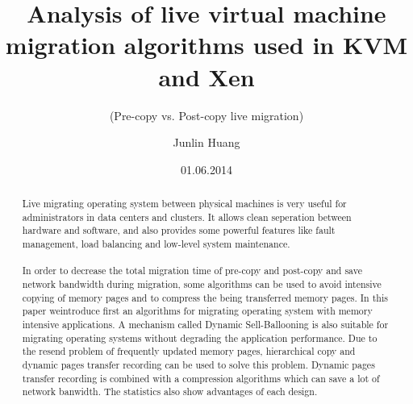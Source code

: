 \documentclass[runningheads]{llncs}
\begin{document}
\mainmatter
\title{Analysis of live virtual machine migration algorithms used in KVM and Xen}
\subtitle{(Pre-copy vs. Post-copy live migration)}
\titlerunning{}
\author{Junlin Huang}
\date{01.06.2014}
\maketitle

\begin{abstract}
Live migrating operating system between physical machines is very useful for administrators in data centers and clusters. It allows clean seperation between hardware and software, and also provides some powerful features like fault management, load balancing and low-level system maintenance.
\\\\
In order to decrease the total migration time of pre-copy and post-copy and save network bandwidth during migration, some algorithms can be used to avoid intensive copying of memory pages and to compress the being transferred memory pages. In this paper weintroduce first an algorithms for migrating operating system with memory intensive applications. A mechanism called Dynamic Sell-Ballooning is also suitable for migrating operating systems without degrading the application performance. Due to the resend problem of frequently updated memory pages, hierarchical copy and dynamic pages transfer recording can be used to solve this problem. Dynamic pages transfer recording is combined with a compression algorithms which can save a lot of network banwidth. The statistics also show advantages of each design.
\end{abstract}
\end{document}
